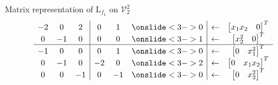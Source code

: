 \documentclass[10pt,T]{beamer}
\begin{document}
\begin{frame}[b]{Matrix representation of L$_{f_1}$ on $\mathcal{V}_2^2$}
\begin{equation*}
\begin{array}{ccc|ccc|cc}
    -2&0&2&0&1&\onslide<3->{0}&\leftarrow&\begin{bmatrix}x_1x_2&0\end{bmatrix}^T\\
    0&-1&0&0&0&\onslide<3->{1}&\leftarrow&\begin{bmatrix}x_2^2&0\end{bmatrix}^T\\\hline
    -1&0&0&0&1&\onslide<3->{0}&\leftarrow&\begin{bmatrix}0&x_1^2\end{bmatrix}^T\\
    0&-1&0&-2&0&\onslide<3->{2}&\leftarrow&\begin{bmatrix}0&x_1x_2\end{bmatrix}^T\\
    0&0&-1&0&-1&\onslide<3->{0}&\leftarrow&\begin{bmatrix}0&x_2^2\end{bmatrix}^T
    \end{array}
\end{equation*}
\end{frame}
\end{document}
